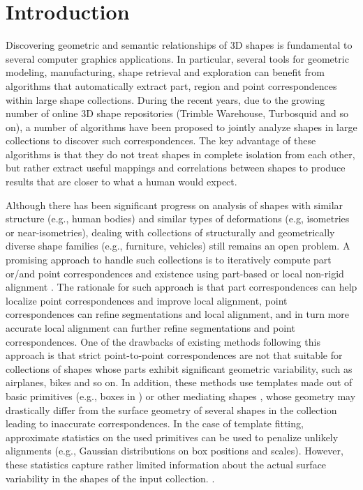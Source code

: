 \section{Introduction}
\label{sec:intro}

\vspace{-2mm}

Discovering geometric and semantic relationships of 3D shapes is fundamental to several computer graphics applications. In particular, several tools for geometric modeling, manufacturing, shape retrieval and exploration can benefit from algorithms that automatically extract part, region and point correspondences within large shape collections. During the recent years, due to the growing number of online 3D shape repositories (Trimble Warehouse, Turbosquid and so on), a number of algorithms have been proposed to jointly analyze shapes in large collections to discover such correspondences. The key advantage of these algorithms is that they do not treat shapes in complete isolation from each other, but rather extract useful mappings and correlations between shapes to produce results that are closer to what a human would expect. 

Although there has been significant progress on analysis of shapes with similar structure (e.g., human bodies) and similar types of deformations (e.g, isometries or near-isometries), dealing with collections of structurally and geometrically diverse shape families (e.g., furniture, vehicles) still remains an open problem. A promising approach to handle such collections is to iteratively compute part or/and point correspondences and existence using part-based or local non-rigid alignment \cite{Kim13,Huang13}. The rationale for such approach is that part correspondences can help localize point correspondences and improve local alignment, point correspondences can refine segmentations and local alignment, and in turn more accurate local alignment can further refine segmentations and point correspondences. One of the drawbacks of existing methods following this approach is that strict point-to-point correspondences are not that suitable for collections of shapes whose parts exhibit significant geometric variability, such as airplanes, bikes and so on. In addition, these methods use templates made out of basic primitives (e.g., boxes in \cite{Kim13}) or other mediating shapes \cite{Huang13}, whose geometry may drastically differ from the surface geometry of several shapes in the collection leading to inaccurate correspondences. In the case of template fitting, approximate statistics on the used primitives can be used to penalize unlikely alignments (e.g., Gaussian distributions on box positions and scales). However, these statistics capture rather limited information about the actual surface variability in the shapes of the input collection. .

